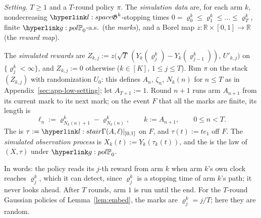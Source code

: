 \documentclass[11pt]{article}
\newcommand{\dt}[1]{\hypertarget{#1}{}}
\newcommand{\R}{\mathbb{R}}
\newcommand{\1}{\mathbf{1}}
\begin{document}
\begin{definition}\label{def:lowsim}\dt{l:sim}
\textit{Setting.} $T\ge1$ and a $T$-round policy $\pi$. The \emph{simulation data} are, for each arm $k$, nondecreasing $\lG^k$-stopping times
$0=\varrho^k_0\le\varrho^k_1\le\dots\le\varrho^k_T$, finite $\gPh_0$-a.s.\ (the \emph{marks}), and a Borel map $z:\R\times[0,1]\to\R$ (the \emph{reward map}).

\noindent The \emph{simulated rewards} are $Z_{k,j}:=z\big(\sqrt T\,(Y_k(\varrho^k_j)-Y_k(\varrho^k_{j-1})),\,U'_{k,j}\big)$ on $\{\varrho^k_j<\infty\}$, and $Z_{k,j}:=0$
otherwise ($k\in[K]$, $1\le j\le T$). Run $\pi$ on the stack $(Z_{k,j})$ with randomization $U_0$: this defines $A_n$, $\zeta_n$, $N_k(n)$ for $n\le T$ as in
Appendix~\ref{sec:app-low-setting}; let $A_{T+1}:=1$. Round $n+1$ runs arm $A_{n+1}$ from its current mark to its next mark; on the event $F$ that all the marks are finite,
its length is
\[
\ell_n:=\varrho^{k}_{N_k(n)+1}-\varrho^{k}_{N_k(n)},\qquad k:=A_{n+1},\qquad 0\le n<T .
\]
The \emph{\lsimal} is $\tau:=\lGam(A,\ell)|_{[0,1]}$ on $F$, and $\tau(t):=te_1$ off $F$. The \emph{simulated observation process} is $X_k(t):=Y_k(\tau_k(t))$, and the
\emph{\lsimpol} is the law of $(X,\tau)$ under $\gPh_0$.
\end{definition}

\noindent In words: the policy reads its $j$-th reward from arm $k$ when arm $k$'s own clock reaches $\varrho^k_j$, which it can detect, since $\varrho^k_j$ is a stopping
time of arm $k$'s path; it never looks ahead. After $T$ rounds, arm $1$ is run until the end. For the $T$-round Gaussian policies of Lemma~\ref{lem:embed}, the marks are
$\varrho^k_j=j/T$; here they are random.
\end{document}
